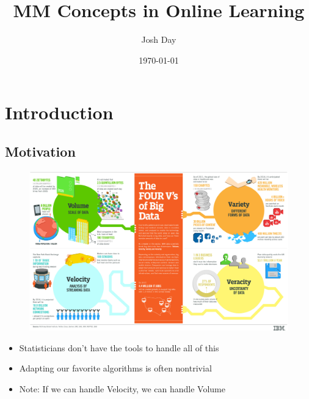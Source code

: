 \documentclass{beamer}
\title[Online MM]{MM Concepts in Online Learning}
\author{Josh Day}
\institute[NC State University]{NC State University \\ \textit{jtday2@ncsu.edu}}
\date{\today}
\begin{document}
\begin{frame}
\titlepage
\end{frame}


\section{Introduction}
\subsection{Motivation}
\begin{frame}
  \begin{figure}
    \includegraphics[width=\linewidth]{figures/4vs.jpg}
  \end{figure}
\end{frame}
\begin{frame}
  \begin{itemize}
    \item Statisticians don't have the tools to handle all of this
    \item Adapting our favorite algorithms is often nontrivial
    \item Note: If we can handle Velocity, we can handle Volume
  \end{itemize}
\end{frame}

\end{document}
